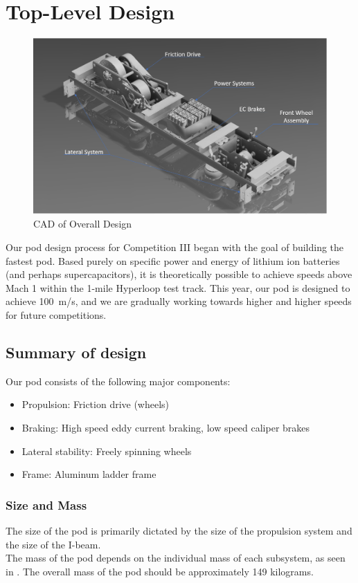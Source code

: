 \documentclass[main.tex]{subfiles}
\begin{document}
\chapter{Top-Level Design}
\label{ch:top-level-design}
    \begin{figure}[H]
        \centering
        \includegraphics[width=\linewidth]{images/jimmypictwopointoh.png}
        \caption{CAD of Overall Design}
    \end{figure}

Our pod design process for Competition III began with the goal of building the fastest pod. Based purely on specific power and energy of lithium ion batteries (and perhaps supercapacitors), it is theoretically possible to achieve speeds above Mach 1 within the 1-mile Hyperloop test track. This year, our pod is designed to achieve \SI{100}{m/s}, and we are gradually working towards higher and higher speeds for future competitions.

\section{Summary of design}
Our pod consists of the following major components:
\begin{itemize}
    \item Propulsion: Friction drive (wheels)
    \item Braking: High speed eddy current braking, low speed caliper brakes
    \item Lateral stability: Freely spinning wheels
    \item Frame: Aluminum ladder frame
\end{itemize}

\subsection{Size and Mass}
The size of the pod is primarily dictated by the size of the propulsion system and the size of the I-beam.\\
  The mass of the pod depends on the individual mass of each subsystem, as seen in . The overall mass of the pod should be approximately 149 kilograms.
\end{document}
